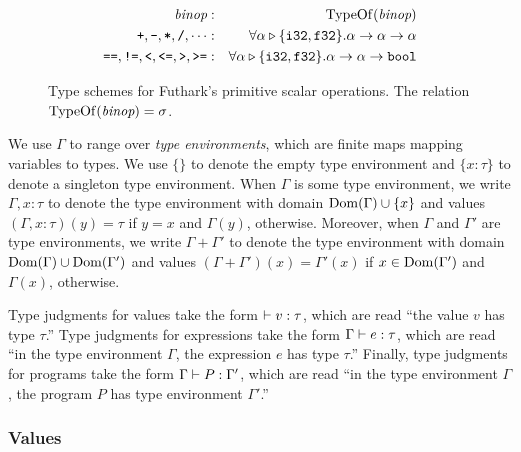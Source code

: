 \documentclass[oneside,11pt]{book}
\begin{document}
\begin{figure}
  \begin{eqnarray*}
\mbox{\it{binop}} & : & \mathrm{TypeOf}(\mbox{\it{binop}}) \\
    \texttt{+},\texttt{-},\texttt{*},\texttt{/},\cdots & : & \forall \alpha \triangleright \{\texttt{i32},\texttt{f32}\}. \alpha \rightarrow \alpha \rightarrow \alpha \\
    \texttt{==},\texttt{!=},\texttt{<},\texttt{<=},\texttt{>},\texttt{>=} & : & \forall \alpha \triangleright \{\texttt{i32},\texttt{f32}\}. \alpha \rightarrow \alpha \rightarrow \texttt{bool}
  \end{eqnarray*}
  \caption{Type schemes for Futhark's primitive scalar operations. The relation $\mathrm{TypeOf}(\mbox{\it{binop}}) = \sigma$.}
  \label{fig:primtypeschemes}
\end{figure}


We use $\Gamma$ to range over \emph{type environments}, which are
finite maps mapping variables to types. We use $\{\}$ to denote the
empty type environment and $\{x:\tau\}$ to denote a singleton type
environment. When $\Gamma$ is some type environment, we write
$\Gamma,x:\tau$ to denote the type environment with domain
${\rm Dom}(\Gamma) \cup \{x\}$ and values $(\Gamma,x:\tau)(y) = \tau$ if
$y=x$ and $\Gamma(y)$, otherwise. Moreover, when $\Gamma$ and
$\Gamma'$ are type environments, we write $\Gamma + \Gamma'$ to denote
the type environment with domain ${\rm Dom}(\Gamma) \cup {\rm Dom}(\Gamma')$ and
values $(\Gamma + \Gamma')(x) = \Gamma'(x)$ if $x \in {\rm Dom}(\Gamma')$
and $\Gamma(x)$, otherwise.

Type judgments for values take the form $\vdash v : \tau$, which are read
``the value $v$ has type $\tau$.'' Type judgments for expressions take
the form $\Gamma \vdash e : \tau$, which are read ``in the type
environment $\Gamma$, the expression $e$ has type $\tau$.'' Finally,
type judgments for programs take the form $\Gamma \vdash P : \Gamma'$,
which are read ``in the type environment $\Gamma$, the program $P$ has
type environment $\Gamma'$.''

\subsubsection*{Values }



\end{document}
